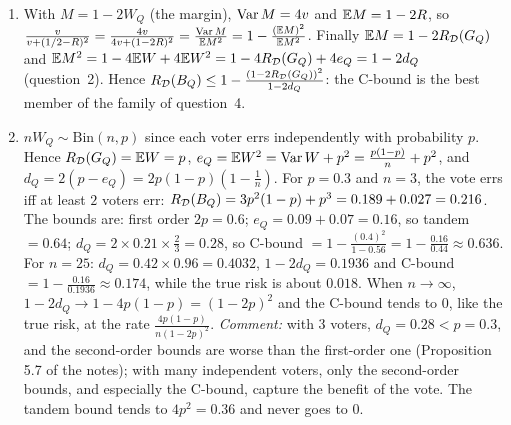 \documentclass[11pt]{article}
\newcounter{exo}
\begin{document}
\begin{solution}
\begin{enumerate}
      which vanishes at $\mu^\star=\frac{R/2-e}{1/2-R}$ (when $R<\frac12$), is negative before and positive after: $\mu^\star$ is
      the minimum. To compute $f(\mu^\star)$, note that $\mu^\star-R=\frac{R/2-e-R/2+R^2}{1/2-R}=\frac{-v}{1/2-R}$ and
      $\frac12-\mu^\star=\frac{1/4-R/2-R/2+e}{1/2-R}=\frac{v+(1/2-R)^2}{1/2-R}$. The numerator is
      $e-2\mu^\star R+\mu^{\star2}=(\mu^\star-R)^2+v=\frac{v^2}{(1/2-R)^2}+v=\frac{v\,(v+(1/2-R)^2)}{(1/2-R)^2}$, so
      \[f(\mu^\star)=\frac{v\,(v+(1/2-R)^2)}{(1/2-R)^2}\cdot\frac{(1/2-R)^2}{(v+(1/2-R)^2)^2}=\frac{v}{v+(1/2-R)^2},\]
      which is Cantelli's inequality for $W_Q$ with $a=\frac12-R$ (compare with Exercise~\ref{exo:concentration}, question~3).
\item With $M=1-2W_Q$ (the margin), $\operatorname{Var} M=4v$ and $\mathbb{E} M=1-2R$, so $\frac{v}{v+(1/2-R)^2}=\frac{4v}{4v+(1-2R)^2}=\frac{\operatorname{Var} M}{\mathbb{E} M^2}=1-\frac{(\mathbb{E} M)^2}{\mathbb{E} M^2}$.
      Finally $\mathbb{E} M=1-2R_{\mathcal{D}}(G_{Q})$ and $\mathbb{E} M^2=1-4\mathbb{E} W+4\mathbb{E} W^2=1-4R_{\mathcal{D}}(G_{Q})+4e_Q=1-2d_Q$ (question~2). Hence
      $R_{\mathcal{D}}(B_{Q})\leq1-\frac{(1-2R_{\mathcal{D}}(G_{Q}))^2}{1-2d_Q}$: the C-bound is the best member of the family of question~4.
\item $nW_Q\sim\mathrm{Bin}(n,p)$ since each voter errs independently with probability $p$. Hence $R_{\mathcal{D}}(G_{Q})=\mathbb{E} W=p$,
      $e_Q=\mathbb{E} W^2=\operatorname{Var} W+p^2=\frac{p(1-p)}n+p^2$, and $d_Q=2(p-e_Q)=2p(1-p)(1-\frac1n)$.
      For $p=0.3$ and $n=3$, the vote errs iff at least $2$ voters err: $R_{\mathcal{D}}(B_{Q})=3p^2(1-p)+p^3=0.189+0.027=0.216$. The
      bounds are: first order $2p=0.6$; $e_Q=0.09+0.07=0.16$, so tandem $=0.64$; $d_Q=2\times0.21\times\frac23=0.28$, so
      C-bound $=1-\frac{(0.4)^2}{1-0.56}=1-\frac{0.16}{0.44}\approx0.636$. For $n=25$: $d_Q=0.42\times0.96=0.4032$,
      $1-2d_Q=0.1936$ and C-bound $=1-\frac{0.16}{0.1936}\approx0.174$, while the true risk is about $0.018$. When $n\to\infty$,
      $1-2d_Q\to1-4p(1-p)=(1-2p)^2$ and the C-bound tends to $0$, like the true risk, at the rate $\frac{4p(1-p)}{n(1-2p)^2}$.
      \emph{Comment:} with $3$ voters, $d_Q=0.28<p=0.3$, and the second-order bounds are worse than the first-order
      one (Proposition 5.7 of the notes); with many independent voters, only the second-order bounds, and
      especially the C-bound, capture the benefit of the vote. The tandem bound tends to $4p^2=0.36$ and never goes
      to $0$.
\end{enumerate}
\end{solution}
\end{document}
